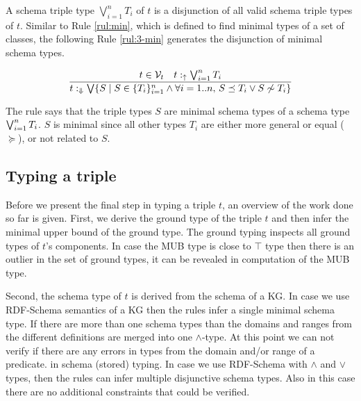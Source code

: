 \documentclass[runningheads]{llncs}
\newcommand{\uarr}{\uparrow}
\newcommand{\Darr}{\Downarrow}
\newcommand{\V}{{\cal V}}
\newcommand{\memo}[1]{}
\begin{document}
A schema triple type $\bigvee_{i=1}^nT_i$ of $t$ is a disjunction of
all valid schema triple types of $t$. Similar to Rule \ref{rul:min},
which is defined to find minimal types of a set of classes, the
following Rule \ref{rul:3-min} generates the disjunction of minimal
schema types.

\begin{equation}
\label{rul:3-min}
\dfrac{t\in\V_t\quad\/t:_\uarr\bigvee_{i=1}^n\/T_i}
      {t:_{\Darr}\bigvee\{S \mid S\in\/\{T_i\}_{i=1}^n\land\forall\/i=1..n,\, S\preceq\/T_i\lor\/S\not\sim\/T_i\}}
\end{equation}

The rule says that the triple types $S$ are minimal schema types of a
schema type $\bigvee_{i=1}^n\/T_i$. $S$ is minimal since all other
types $T_i$ are either more general or equal ($\succeq$), or not
related to $S$. 

\memo{
The following rule gathers all minimal schema types of
$\bigvee_{i=1}^n\/T_i$.
\begin{equation}
\label{rul:3-min-gather}
\dfrac{t\in\V_t\quad\forall\/j=1..m,\, t:_\Darr\/S_j}
      {t:_{\uarr}\bigvee_{j=1}^m\/S_j}
\end{equation}

The above rule is identical to the Rule \ref{rul:min-gather} except
that in this setting it handles triples and not identifiers. The
result is a disjunction of minimal schema types $S_1,\ldots,S_m$.}






\subsection{Typing a triple}

Before we present the final step in typing a triple $t$, an overview
of the work done so far is given. First, we derive the ground type of
the triple $t$ and then infer the minimal upper bound of the ground
type. The ground typing inspects all ground types of $t$'s
components. In case the MUB type is close to $\top$ type then there is
an outlier in the set of ground types, it can be revealed in
computation of the MUB type. 

Second, the schema type of $t$ is derived from the schema of a KG. In
case we use RDF-Schema semantics of a KG then the rules infer a single
minimal schema type. If there are more than one schema types than the
domains and ranges from the different definitions are merged into one
$\land$-type. At this point we can not verify if there are any errors
in types from the domain and/or range of a predicate. in schema
(stored) typing. In case we use RDF-Schema with $\land$ and $\lor$
types, then the rules can infer multiple disjunctive schema
types. Also in this case there are no additional constraints that
could be verified.
\end{document}
